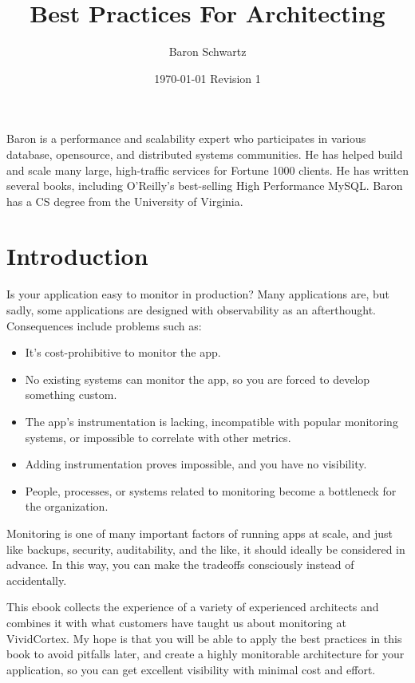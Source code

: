 \documentclass{vivid_layout}
\title{Best Practices For Architecting}{\fontsize{30pt}{15pt}\selectfont Highly Monitorable Applications}
\date{\color{white} \today{} \textbullet{} Revision 1}
\author{Baron Schwartz}{img/baron}
\begin{document}
\maketitle		%
\begin{bio}		%
Baron is a performance and scalability expert who participates in various
database, opensource, and distributed systems communities. He has helped build
and scale many large, high-traffic services for Fortune 1000 clients. He has
written several books, including O'Reilly's best-selling High Performance MySQL.
Baron has a CS degree from the University of Virginia.
\end{bio}
\tableofcontents	%

\section{Introduction}

Is your application easy to monitor in production? Many applications are, but
sadly, some applications are designed with observability as an afterthought.
Consequences include problems such as:

\begin{itemize}
\item It's cost-prohibitive to monitor the app.
\item No existing systems can monitor the app, so you are forced to develop
something custom.
\item The app's instrumentation is lacking, incompatible with popular monitoring
systems, or impossible to correlate with other metrics.
\item Adding instrumentation proves impossible, and you have no visibility.
\item People, processes, or systems related to monitoring become a bottleneck for the organization.
\end{itemize}

Monitoring is one of many important factors of running apps at scale, and just
like backups, security, auditability, and the like, it should ideally be
considered in advance. In this way, you can make the tradeoffs consciously instead
of accidentally.

This ebook collects the experience of a variety of experienced architects and
combines it with what customers have taught us about monitoring at
VividCortex. My hope is that you will be able to apply the best practices in
this book to avoid pitfalls later, and create a highly monitorable
architecture for your application, so you can get excellent visibility with
minimal cost and effort. 
\end{document}
